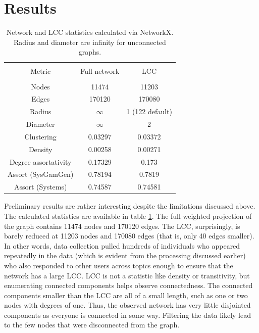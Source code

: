 \documentclass[12pt, a4paper]{article}
\begin{document}
\section{Results}
\begin{table}
\centering
  \begin{tabular} {c c c}
    \hline \\
    Metric & Full network & LCC \\
    \hline \\
    Nodes & 11474 & 11203 \\
    Edges & 170120 & 170080 \\
    Radius & $\infty$ & 1 (122 default) \\
    Diameter & $\infty$ & 2 \\
    Clustering & 0.03297 & 0.03372 \\
    Density & 0.00258 & 0.00271 \\
    Degree assortativity & 0.17329 & 0.173 \\
    Assort (SysGamGen) & 0.78194 & 0.7819 \\
    Assort (Systems) & 0.74587 & 0.74581 \\
    \hline
  \end{tabular}
  \caption{Network and LCC statistics calculated via NetworkX. Radius and diameter are infinity for unconnected graphs.}
  \label{tab:NetworkStats}
\end{table}

Preliminary results are rather interesting despite the limitations discussed above. The calculated statistics are available in table \ref{tab:NetworkStats}. The full weighted projection of the graph contains 11474 nodes and 170120 edges. The LCC, surprisingly, is barely reduced at 11203 nodes and 170080 edges (that is, only 40 edges smaller). In other words, data collection pulled hundreds of individuals who appeared repeatedly in the data (which is evident from the processing discussed earlier) who also responded to other users across topics enough to ensure that the network has a large LCC. LCC is not a statistic like density or transitivity, but enumerating connected components helps observe connectedness. The connected components smaller than the LCC are all of a small length, such as one or two nodes with degrees of one. Thus, the observed network has very little disjointed components as everyone is connected in some way. Filtering the data likely lead to the few nodes that were disconnected from the graph.
\end{document}
